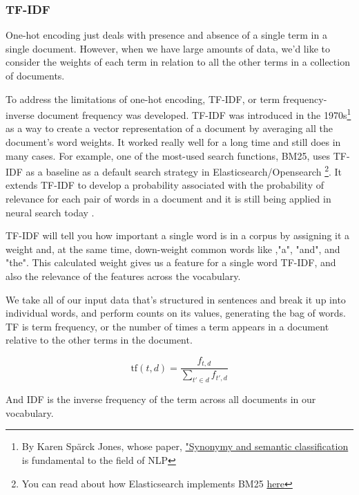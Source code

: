 \documentclass[11pt, table]{diazessay} %
\begin{document}
\begin{sloppypar}
\subsubsection{TF-IDF}

One-hot encoding just deals with presence and absence of a single term in a single document. However, when we have large amounts of data, we'd like to consider the weights of each term in relation to all the other terms in a collection of documents.

To address the limitations of one-hot encoding, TF-IDF, or term frequency-inverse document frequency was developed. TF-IDF was introduced in the 1970s\footnote{By Karen Spärck Jones, whose paper, \href{https://blog.babbar.tech/who-is-karen-sparck-jones/}{"Synonymy and semantic classification} is fundamental to the field of NLP} as a way to create a vector representation of a document by averaging all the document's word weights. It worked really well for a long time and still does in many cases.  For example, one of the most-used search functions, BM25, uses TF-IDF as a baseline  \citep{schutze2008introduction} as a default search strategy in Elasticsearch/Opensearch \footnote{You can read about how Elasticsearch implements BM25 \href{https://www.elastic.co/blog/practical-bm25-part-1-how-shards-affect-relevance-scoring-in-elasticsearch}{here}}. It extends TF-IDF to develop a probability associated with the probability of relevance for each pair of words in a document and it is still being applied in neural search today  \citep{svore2009machine}.  

TF-IDF will tell you how important a single word is in a corpus by assigning it a weight and, at the same time, down-weight common words like ,"a", "and", and "the". This calculated weight gives us a feature for a single word TF-IDF, and also the relevance of the features across the vocabulary.

We take all of our input data that's structured in sentences and break it up into individual words, and perform counts on its values, generating the bag of words. TF is term frequency, or the number of times a term appears in a document relative to the other terms in the document.

\begin{equation}
\mathrm{tf}(t,d) = \frac{f_{t,d}}{{\sum_{t' \in d}{f_{t',d}}}}
\end{equation}

And IDF is the inverse frequency of the term across all documents in our vocabulary.


\end{sloppypar}
\end{document}
